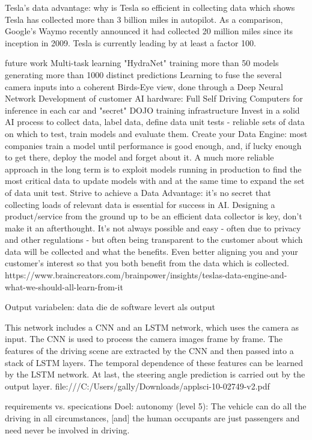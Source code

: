 Tesla's data advantage: why is Tesla so efficient in collecting data
which shows Tesla has collected more than 3 billion miles in autopilot. As a comparison, Google's Waymo recently announced it had collected 20 million miles since its inception in 2009. Tesla is currently leading by at least a factor 100.

future work
Multi-task learning "HydraNet" training more than 50 models generating more than 1000 distinct predictions
Learning to fuse the several camera inputs into a coherent Birds-Eye view, done through a Deep Neural Network
Development of customer AI hardware: Full Self Driving Computers for inference in each car and "secret" DOJO training infrastructure
Invest in a solid AI process to collect data, label data, define data unit tests - reliable sets of data on which to test, train models and evaluate them. 
Create your Data Engine: most companies train a model until performance is good enough, and, if lucky enough to get there, deploy the model and forget about it. A much more reliable approach in the long term is to exploit models running in production to find the most critical data to update models with and at the same time to expand the set of data unit test.
Strive to achieve a Data Advantage: it's no secret that collecting loads of relevant data is essential for success in AI. Designing a product/service from the ground up to be an efficient data collector is key, don't make it an afterthought. It's not always possible and easy - often due to privacy and other regulations - but often being transparent to the customer about which data will be collected and what the benefits. Even better aligning you and your customer's interest so that you both benefit from the data which is collected.
https://www.braincreators.com/brainpower/insights/teslas-data-engine-and-what-we-should-all-learn-from-it

Output variabelen: data die de software levert als output

This network includes a CNN and an LSTM network, which uses the camera as input.
The CNN is used to process the camera images frame by frame. The features of the driving scene are
extracted by the CNN and then passed into a stack of LSTM layers. The temporal dependence of these
features can be learned by the LSTM network. At last, the steering angle prediction is carried out by
the output layer.
file:///C:/Users/gally/Downloads/applsci-10-02749-v2.pdf


requirements vs. specications
Doel: autonomy (level 5): The vehicle can do all the driving in all circumstances, [and] the human occupants are just passengers and need never be involved in driving.

